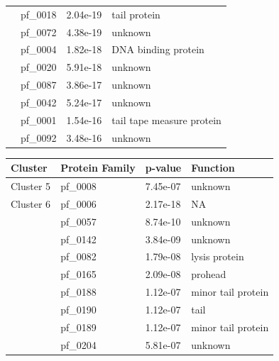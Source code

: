 \begin{table}
\begin{lrbox}{\leftbox}
\begin{tabular}[t]{llll}
                                        & pf\_0018 & 2.04e-19 & tail protein \\ 
                                        & pf\_0072 & 4.38e-19 & unknown \\ 
                                        & pf\_0004 & 1.82e-18 & DNA binding protein \\ 
                                        & pf\_0020 & 5.91e-18 & unknown \\ 
                                        & pf\_0087 & 3.86e-17 & unknown \\ 
                                        & pf\_0042 & 5.24e-17 & unknown \\ 
                                        & pf\_0001 & 1.54e-16 & tail tape measure protein \\ 
                                        & pf\_0092 & 3.48e-16 & unknown \\ 
            \midrule
            \end{tabular}
    \end{lrbox}
    \begin{lrbox}{\rightbox}
            \begin{tabular}[t]{llll}
            \toprule
            Cluster & Protein Family & p-value & Function \\
            \midrule
            \multirow{1}{*}{Cluster 5} & pf\_0008 & 7.45e-07 & unknown \\ 
            \midrule
            \multirow{1}{*}{Cluster 6} & pf\_0006 & 2.17e-18 & NA \\ 
                                        & pf\_0057 & 8.74e-10 & unknown \\ 
                                        & pf\_0142 & 3.84e-09 & unknown \\ 
                                        & pf\_0082 & 1.79e-08 & lysis protein \\ 
                                        & pf\_0165 & 2.09e-08 & prohead \\ 
                                        & pf\_0188 & 1.12e-07 & minor tail protein \\ 
                                        & pf\_0190 & 1.12e-07 & tail \\ 
                                        & pf\_0189 & 1.12e-07 & minor tail protein \\ 
                                        & pf\_0204 & 5.81e-07 & unknown \\ 
            \midrule

\end{tabular}
\end{lrbox}
\end{table}
